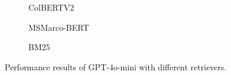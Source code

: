\begin{figure}
\centering

\begin{subfigure}[b]{1.0\textwidth}
    
    \vspace{-1.0em}
    \caption{\scriptsize ColBERTV2}\label{fig:scores_colbert}
\end{subfigure}

\vspace{1.0em}

\begin{subfigure}[b]{0.49\textwidth}
    
    \caption{\scriptsize MSMarco-BERT}\label{fig:scores_dense}
\end{subfigure}
\begin{subfigure}[b]{0.49\textwidth}
    
    \caption{\scriptsize BM25}\label{fig:scores_bm25}
\end{subfigure}

\caption{Performance results of GPT-4o-mini with different retrievers.}
\label{fig:scores_gpt4o}
\end{figure}